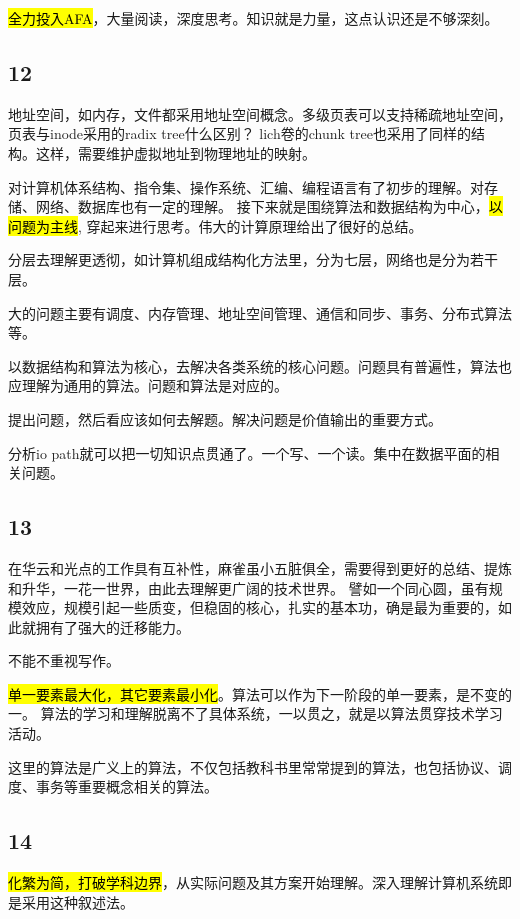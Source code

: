 \hl{全力投入AFA}，大量阅读，深度思考。知识就是力量，这点认识还是不够深刻。

\subsection{12}

地址空间，如内存，文件都采用地址空间概念。多级页表可以支持稀疏地址空间，页表与inode采用的radix tree什么区别？
lich卷的chunk tree也采用了同样的结构。这样，需要维护虚拟地址到物理地址的映射。

对计算机体系结构、指令集、操作系统、汇编、编程语言有了初步的理解。对存储、网络、数据库也有一定的理解。
接下来就是围绕算法和数据结构为中心，\hl{以问题为主线}, 穿起来进行思考。伟大的计算原理给出了很好的总结。

分层去理解更透彻，如计算机组成结构化方法里，分为七层，网络也是分为若干层。

大的问题主要有调度、内存管理、地址空间管理、通信和同步、事务、分布式算法等。

以数据结构和算法为核心，去解决各类系统的核心问题。问题具有普遍性，算法也应理解为通用的算法。问题和算法是对应的。

提出问题，然后看应该如何去解题。解决问题是价值输出的重要方式。

分析io path就可以把一切知识点贯通了。一个写、一个读。集中在数据平面的相关问题。

\subsection{13}

在华云和光点的工作具有互补性，麻雀虽小五脏俱全，需要得到更好的总结、提炼和升华，一花一世界，由此去理解更广阔的技术世界。
譬如一个同心圆，虽有规模效应，规模引起一些质变，但稳固的核心，扎实的基本功，确是最为重要的，如此就拥有了强大的迁移能力。

不能不重视写作。

\hl{单一要素最大化，其它要素最小化}。算法可以作为下一阶段的单一要素，是不变的一。
算法的学习和理解脱离不了具体系统，一以贯之，就是以算法贯穿技术学习活动。

这里的算法是广义上的算法，不仅包括教科书里常常提到的算法，也包括协议、调度、事务等重要概念相关的算法。

\subsection{14}

\hl{化繁为简，打破学科边界}，从实际问题及其方案开始理解。深入理解计算机系统即是采用这种叙述法。

